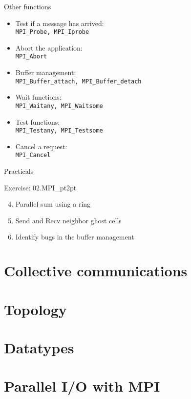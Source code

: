 \documentclass[aspectratio=43]{beamer}
\begin{document}
\begin{frame}[fragile]{Other functions}
\begin{itemize}
    \item Test if a message has arrived:\\\hspace{1cm}\verb+MPI_Probe, MPI_Iprobe+
    \item Abort the application:\\\hspace{1cm}\verb+MPI_Abort+
    \item Buffer management:\\\hspace{1cm}\verb+MPI_Buffer_attach, MPI_Buffer_detach+
    \item Wait functions:\\\hspace{1cm}\verb+MPI_Waitany, MPI_Waitsome+
    \item Test functions:\\\hspace{1cm}\verb+MPI_Testany, MPI_Testsome+
    \item Cancel a request:\\\hspace{1cm}\verb+MPI_Cancel+
\end{itemize}
\end{frame}

\begin{frame}{Practicals}
    \begin{brown2block}{Exercise: 02.MPI\_pt2pt}
    \begin{enumerate}
        \setcounter{enumi}{3}
        \item Parallel sum using a ring
        \item Send and Recv neighbor ghost cells
        \item Identify bugs in the buffer management
    \end{enumerate}
    \end{brown2block}
\end{frame}

\section{Collective communications}
\section{Topology}
\section{Datatypes}
\section{Parallel I/O with MPI}

\end{document}
